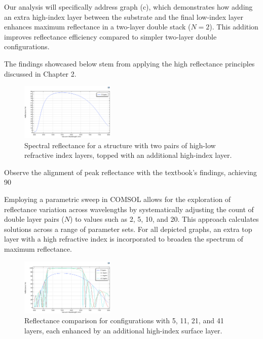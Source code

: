 Our analysis will specifically address graph (c), which demonstrates how adding an extra high-index layer between the substrate and the final low-index layer enhances maximum reflectance in a two-layer double stack ($N = 2$). This addition improves reflectance efficiency compared to simpler two-layer double configurations.

The findings showcased below stem from applying the high reflectance principles discussed in Chapter 2.

\begin{figure}[ht!]
  \centering
  \includegraphics[width=0.4\textwidth]{Chapters/Figures/Chapter 4 Figures/High-Reflectance (5 Layers).png}
  \caption{Spectral reflectance for a structure with two pairs of high-low refractive index layers, topped with an additional high-index layer.}
  \label{fig:Reflectance 5-layer structure}
\end{figure}

Observe the alignment of peak reflectance with the textbook's findings, achieving 90%

Employing a parametric sweep in COMSOL allows for the exploration of reflectance variation across wavelengths by systematically adjusting the count of double layer pairs ($N$) to values such as 2, 5, 10, and 20. This approach calculates solutions across a range of parameter sets. For all depicted graphs, an extra top layer with a high refractive index is incorporated to broaden the spectrum of maximum reflectance.

\begin{figure}[ht!]
  \centering
  \includegraphics[width=0.4\textwidth]{Chapters/Figures/Chapter 4 Figures/High-Reflectance (5, 11, 21, and 41 Layers).png}
  \caption{Reflectance comparison for configurations with 5, 11, 21, and 41 layers, each enhanced by an additional high-index surface layer.}
  \label{fig:COMSOL multi-layer reflectance results}
\end{figure}

